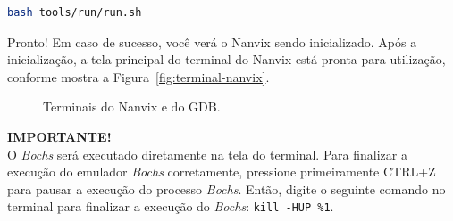 \documentclass[11pt]{article}
\newcommand*{\alert}[1]{\vspace{0.4cm}\colorbox{gray!60!white}{\parbox{0.92\linewidth}{{\centering \textbf{IMPORTANTE!}\\}#1}}\vspace{0.4cm}}
\begin{document}
\begin{lstlisting}[language=bash,numbers=none,frame=single]
bash tools/run/run.sh
\end{lstlisting}

\vspace{0.3cm}
Pronto! Em caso de sucesso, você verá o Nanvix sendo inicializado. Após a inicialização, a tela principal do terminal do Nanvix está pronta para utilização, conforme mostra a Figura~\ref{fig:terminal-nanvix}.

\begin{figure}[t]
	\centering
\caption{Terminais do Nanvix e do GDB.}
\end{figure}

\alert{O \textit{Bochs} será executado diretamente na tela do terminal. Para finalizar a execução do emulador \textit{Bochs} corretamente, pressione primeiramente CTRL+Z para pausar a execução do processo \textit{Bochs}. Então, digite o seguinte comando no terminal para finalizar a execução do \textit{Bochs}: \texttt{kill -HUP \%1}.}
\end{document}
